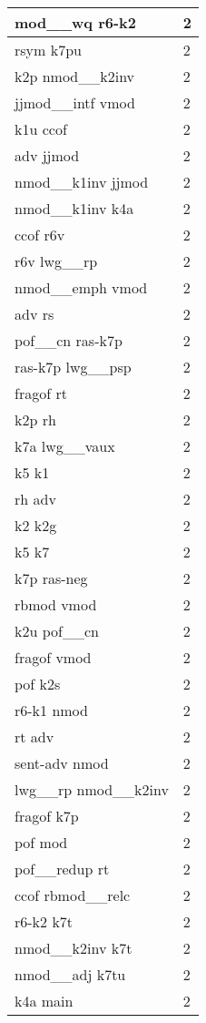 \documentclass[a4 paper]{article}
\begin{document}
\begin{longtable}{p{}p{}}
mod\_\_wq r6-k2  & 2 \\ \midrule
rsym k7pu  & 2 \\ \midrule
k2p nmod\_\_k2inv  & 2 \\ \midrule
jjmod\_\_intf vmod  & 2 \\ \midrule
k1u ccof  & 2 \\ \midrule
adv jjmod  & 2 \\ \midrule
nmod\_\_k1inv jjmod  & 2 \\ \midrule
nmod\_\_k1inv k4a  & 2 \\ \midrule
ccof r6v  & 2 \\ \midrule
r6v lwg\_\_rp  & 2 \\ \midrule
nmod\_\_emph vmod  & 2 \\ \midrule
adv rs  & 2 \\ \midrule
pof\_\_cn ras-k7p  & 2 \\ \midrule
ras-k7p lwg\_\_psp  & 2 \\ \midrule
fragof rt  & 2 \\ \midrule
k2p rh  & 2 \\ \midrule
k7a lwg\_\_vaux  & 2 \\ \midrule
k5 k1  & 2 \\ \midrule
rh adv  & 2 \\ \midrule
k2 k2g  & 2 \\ \midrule
k5 k7  & 2 \\ \midrule
k7p ras-neg  & 2 \\ \midrule
rbmod vmod  & 2 \\ \midrule
k2u pof\_\_cn  & 2 \\ \midrule
fragof vmod  & 2 \\ \midrule
pof k2s  & 2 \\ \midrule
r6-k1 nmod  & 2 \\ \midrule
rt adv  & 2 \\ \midrule
sent-adv nmod  & 2 \\ \midrule
lwg\_\_rp nmod\_\_k2inv  & 2 \\ \midrule
fragof k7p  & 2 \\ \midrule
pof mod  & 2 \\ \midrule
pof\_\_redup rt  & 2 \\ \midrule
ccof rbmod\_\_relc  & 2 \\ \midrule
r6-k2 k7t  & 2 \\ \midrule
nmod\_\_k2inv k7t  & 2 \\ \midrule
nmod\_\_adj k7tu  & 2 \\ \midrule
k4a main  & 2 \\ \midrule

\end{longtable}
\end{document}
